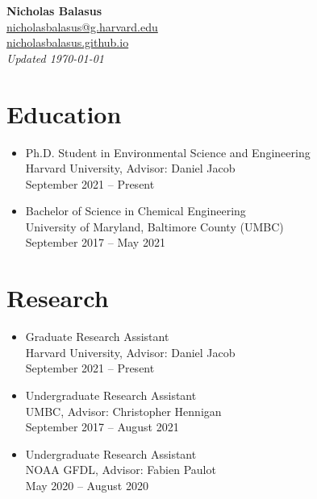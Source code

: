 \documentclass[10pt]{article}
\begin{document}
\begin{center}
{\LARGE\bfseries Nicholas Balasus}\\[3mm]
\href{mailto:nicholasbalasus@g.harvard.edu}{nicholasbalasus@g.harvard.edu}\\
\href{https://nicholasbalasus.github.io}{nicholasbalasus.github.io}\\
\textit{Updated \today}
\end{center}

\section*{Education}
\begin{itemize}
    \itemsep0em 
    \item Ph.D. Student in Environmental Science and Engineering\\
    Harvard University, Advisor: Daniel Jacob\\
    September 2021 -- Present
    \item Bachelor of Science in Chemical Engineering\\
    University of Maryland, Baltimore County (UMBC)\\
    September 2017 -- May 2021
\end{itemize}

\section*{Research}
\begin{itemize}
    \itemsep0em 
    \item Graduate Research Assistant\\
    Harvard University, Advisor: Daniel Jacob\\
    September 2021 -- Present
    \item Undergraduate Research Assistant\\
    UMBC, Advisor: Christopher Hennigan\\
    September 2017 -- August 2021
    \item Undergraduate Research Assistant\\
    NOAA GFDL, Advisor: Fabien Paulot\\
    May 2020 -- August 2020
\end{itemize}
\end{document}
